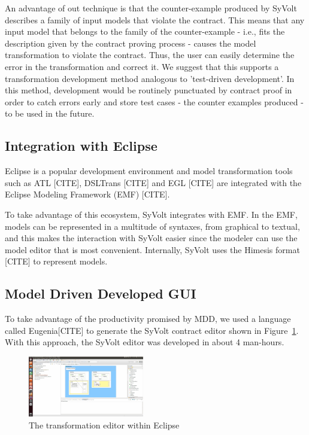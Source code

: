 An advantage of out technique is that the counter-example produced by SyVolt
describes a family of input models that violate the contract. This means that
any input model that belongs to the family of the counter-example - i.e., fits
the description given by the contract proving process - causes the model
transformation to violate the contract.  Thus, the user can easily determine the error in the
transformation and correct it. We suggest that this supports a transformation
development method analogous to 'test-driven development'. In this method,
development would be routinely punctuated by contract proof in order to catch
errors early and store test cases - the counter examples produced - to be used in the future.


\subsection{Integration with Eclipse}

Eclipse is a popular development environment and model transformation
tools such as ATL [CITE], DSLTrans [CITE] and EGL [CITE] are integrated with the
Eclipse Modeling Framework (EMF) [CITE].

To take advantage of this ecosystem, SyVolt integrates with EMF.
In the EMF, models can be represented in a multitude of syntaxes, from graphical
to textual, and this makes the interaction with SyVolt easier since the modeler
can use the model editor that is most convenient. Internally, SyVolt uses 
the Himesis format [CITE] to represent models.

\subsection{Model Driven Developed GUI}

To take advantage of the productivity promised by MDD, we used a language called
Eugenia[CITE] to generate the SyVolt contract editor shown in
Figure~\ref{fig:eclipse_frontend}.
With this approach, the SyVolt editor was developed in about 4 man-hours.

\begin{figure}
\centering
\includegraphics[width=0.45\textwidth]{figures/eclipse_frontend}
\caption{The transformation editor within Eclipse}
\label{fig:eclipse_frontend}
\end{figure}

